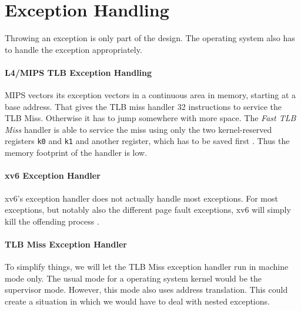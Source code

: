 
\section{Exception Handling}
Throwing an exception is only part of the design. The operating system also has to handle the exception appropriately.

\paragraph{L4/MIPS TLB Exception Handling}
MIPS vectors its exception vectors in a continuous area in memory, starting at a base address.
That gives the TLB miss handler 32 instructions to service the TLB Miss. Otherwise it has to jump
somewhere with more space.
The \emph{Fast TLB Miss} handler is able to service the miss using only the two kernel-reserved
registers \texttt{k0} and \texttt{k1} and another register, which has to be saved first \cite{heiserAnatomyHighPerformanceMicrokernel}.
Thus the memory footprint of the handler is low.

\paragraph{xv6 Exception Handler}
xv6's exception handler does not actually handle most exceptions. For most exceptions,
but notably also the different page fault exceptions, xv6 will simply kill the offending process \cite{cox2011xv6}.

\paragraph{TLB Miss Exception Handler}
To simplify things, we will let the TLB Miss exception handler run in machine mode only.
The usual mode for a operating system kernel would be the supervisor mode. However, this
mode also uses address translation. This could create a situation in which we would have
to deal with nested exceptions.

